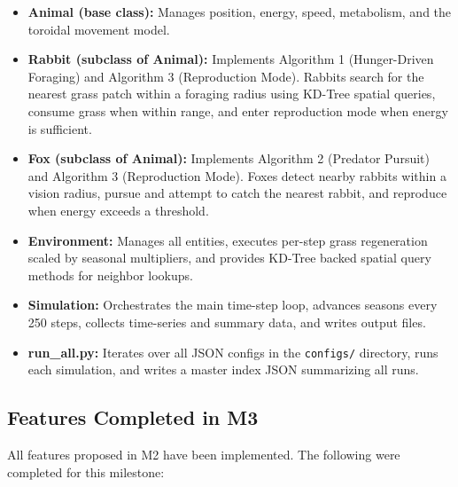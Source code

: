 \documentclass[12pt]{article}
\begin{document}
\begin{itemize}
    \item \textbf{Animal (base class):} Manages position, energy, speed,
    metabolism, and the toroidal movement model.

    \item \textbf{Rabbit (subclass of Animal):} Implements Algorithm 1
    (Hunger-Driven Foraging) and Algorithm 3 (Reproduction Mode). Rabbits
    search for the nearest grass patch within a foraging radius using KD-Tree
    spatial queries, consume grass when within range, and enter reproduction
    mode when energy is sufficient.

    \item \textbf{Fox (subclass of Animal):} Implements Algorithm 2 (Predator
    Pursuit) and Algorithm 3 (Reproduction Mode). Foxes detect nearby rabbits
    within a vision radius, pursue and attempt to catch the nearest rabbit, and
    reproduce when energy exceeds a threshold.

    \item \textbf{Environment:} Manages all entities, executes per-step grass
    regeneration scaled by seasonal multipliers, and provides KD-Tree backed
    spatial query methods for neighbor lookups.

    \item \textbf{Simulation:} Orchestrates the main time-step loop, advances
    seasons every 250 steps, collects time-series and summary data, and writes
    output files.

    \item \textbf{run\_all.py:} Iterates over all JSON configs in the
    \texttt{configs/} directory, runs each simulation, and writes a master
    index JSON summarizing all runs.
\end{itemize}

\subsection{Features Completed in M3}

All features proposed in M2 have been implemented. The following were
completed for this milestone:
\end{document}
